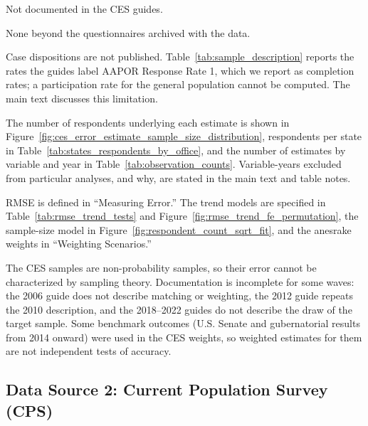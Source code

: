 \documentclass[12pt]{article}
\begin{document}
\begin{description}[style=unboxed, leftmargin=0pt, font=\normalfont\bfseries]
\item[Screening criteria and process:] Not documented in the CES guides.

\item[Study stimuli:] None beyond the questionnaires archived with the data.

\item[Dispositions or response or participation rates:] Case dispositions are not published. Table~\ref{tab:sample_description} reports the rates the guides label AAPOR Response Rate 1, which we report as completion rates; a participation rate for the general population cannot be computed. The main text discusses this limitation.

\item[Sample sizes:] The number of respondents underlying each estimate is shown in Figure~\ref{fig:ces_error_estimate_sample_size_distribution}, respondents per state in Table~\ref{tab:states_respondents_by_office}, and the number of estimates by variable and year in Table~\ref{tab:observation_counts}. Variable-years excluded from particular analyses, and why, are stated in the main text and table notes.

\item[Measurement and model specification:] RMSE is defined in ``Measuring Error.'' The trend models are specified in Table~\ref{tab:rmse_trend_tests} and Figure~\ref{fig:rmse_trend_fe_permutation}, the sample-size model in Figure~\ref{fig:respondent_count_sqrt_fit}, and the anesrake weights in ``Weighting Scenarios.''

\item[Limitations:] The CES samples are non-probability samples, so their error cannot be characterized by sampling theory. Documentation is incomplete for some waves: the 2006 guide does not describe matching or weighting, the 2012 guide repeats the 2010 description, and the 2018--2022 guides do not describe the draw of the target sample. Some benchmark outcomes (U.S. Senate and gubernatorial results from 2014 onward) were used in the CES weights, so weighted estimates for them are not independent tests of accuracy.
\end{description}

\subsection*{Data Source 2: Current Population Survey (CPS)}
\end{document}
